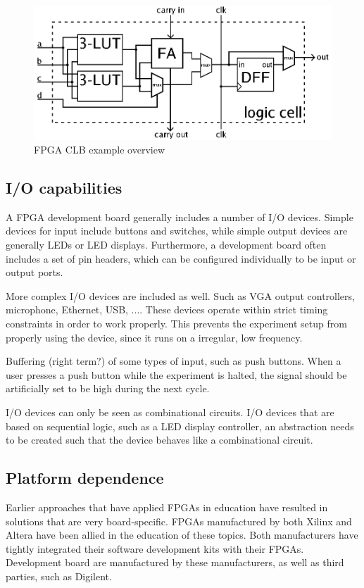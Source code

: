 \documentclass[openright]{uva-bachelor-thesis}
\begin{document}
\begin{figure}
\centering
\includegraphics[width=.7\textwidth]{fpga-clb}
\caption{FPGA CLB example overview \cite{fpgaclbimg}}
\label{fig:my_label}
\end{figure}



\subsection{I/O capabilities}
A FPGA development board generally includes a number of I/O devices. Simple devices for input include buttons and switches, while simple output devices are generally LEDs or LED displays. Furthermore, a development board often includes a set of pin headers, which can be configured individually to be input or output ports. 

More complex I/O devices are included as well. Such as VGA output controllers, microphone, Ethernet, USB, .... These devices operate within strict timing constraints in order to work properly. This prevents the experiment setup from properly using the device, since it runs on a irregular, low frequency. 

Buffering (right term?) of some types of input, such as push buttons. When a user presses a push button while the experiment is halted, the signal should be artificially set to be high during the next cycle.

I/O devices can only be seen as combinational circuits. I/O devices that are based on sequential logic, such as a LED display controller, an abstraction needs to be created such that the device behaves like a combinational circuit. 

\subsection{Platform dependence}
Earlier approaches that have applied FPGAs in education have resulted in solutions that are very board-specific. FPGAs manufactured by both Xilinx and Altera have been allied in the education of these topics. Both manufacturers have tightly integrated their software development kits with their FPGAs. Development board are manufactured by these manufacturers, as well as third parties, such as Digilent. 
\end{document}
